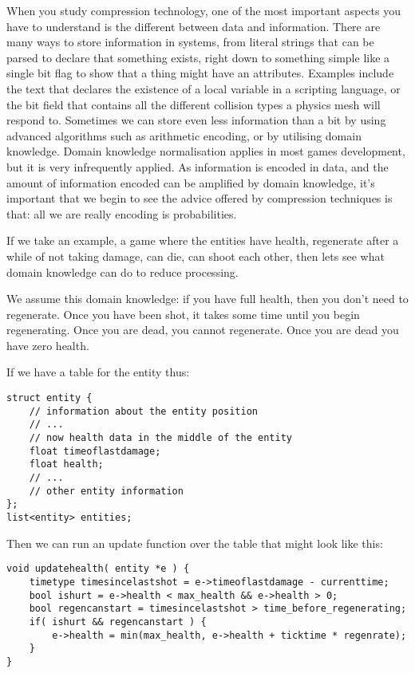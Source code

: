When you study compression technology, one of the most important aspects you
have to understand is the different between data and information. There are
many ways to store information in systems, from literal strings that can be
parsed to declare that something exists, right down to something simple like a
single bit flag to show that a thing might have an attributes. Examples include
the text that declares the existence of a local variable in a scripting
language, or the bit field that contains all the different collision types a
physics mesh will respond to. Sometimes we can store even less information than
a bit by using advanced algorithms such as arithmetic encoding, or by utilising
domain knowledge. Domain knowledge normalisation applies in most games
development, but it is very infrequently applied. As information is encoded in
data, and the amount of information encoded can be amplified by domain
knowledge, it's important that we begin to see the advice offered by
compression techniques is that: all we are really encoding is probabilities.

If we take an example, a game where the entities have health, regenerate after
a while of not taking damage, can die, can shoot each other, then lets see what
domain knowledge can do to reduce processing.

We assume this domain knowledge: if you have full health, then you don't need
to regenerate.  Once you have been shot, it takes some time until you begin
regenerating.  Once you are dead, you cannot regenerate.  Once you are dead you
have zero health.

If we have a table for the entity thus:

\begin{lstlisting}[caption=naive entity table]
struct entity {
	// information about the entity position
	// ... 
	// now health data in the middle of the entity
	float timeoflastdamage;
	float health;
	// ...
	// other entity information
};
list<entity> entities;
\end{lstlisting}

Then we can run an update function over the table that might look like this:

\begin{lstlisting}[caption=every entity health regen]
void updatehealth( entity *e ) {
	timetype timesincelastshot = e->timeoflastdamage - currenttime;
	bool ishurt = e->health < max_health && e->health > 0;
	bool regencanstart = timesincelastshot > time_before_regenerating;
	if( ishurt && regencanstart ) {
		e->health = min(max_health, e->health + ticktime * regenrate);
	}
}
\end{lstlisting}

